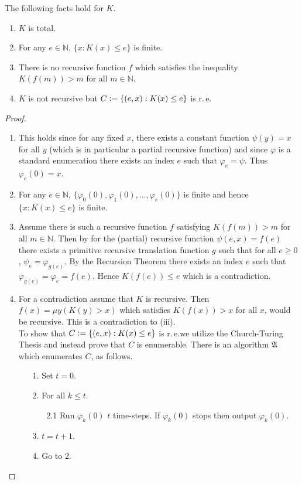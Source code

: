 \begin{prop}\label{prop:fact}
The following facts hold for $K$.
\begin{enumerate}
\item $K$ is total.
\item For any $e\in \mathbb{N}$, $\lbrace x : K(x) \le e \rbrace$ is finite.
\item There is no recursive function $f$ which satisfies the inequality $K(f(m)) > m$ for all $m \in \mathbb{N}$.
\item $K$ is not recursive but $C \vcentcolon= \lbrace (e,x): K(x) \le e \rbrace$ is r.\,e. 
\end{enumerate}
\end{prop}
\begin{proof}
\begin{enumerate}
\item  This holds since for any fixed $x$, there exists a constant function $\psi(y) = x$ for all $y$ (which is in particular a partial recursive function) and since $\varphi$ is a standard enumeration there exists an index $e$ such that $\varphi_e=\psi$. Thus $\varphi_e(0) = x$.
\item For any $e\in \mathbb{N}$, $\lbrace \varphi_0(0), \varphi_1(0), \ldots, \varphi_e(0) \rbrace$ is finite and hence $\lbrace x : K(x) \le e \rbrace$ is finite.
\item Assume there is such a recursive function $f$ satisfying $K(f(m)) > m$ for all $m \in \mathbb{N}$. Then by  for the (partial) recursive function $\psi(e,x) = f(e)$ there exists a primitive recursive translation function $g$ such that for all $e\ge 0$, $\psi_e = \varphi_{g(e)}$. By the Recursion Theorem there exists an index $e$ such that $\varphi_{g(e)} = \varphi_e=f(e)$. Hence $K(f(e)) \le e$ which is a contradiction.
\item For a contradiction assume that $K$ is recursive. Then $f(x) = \mu  y  (K(y) > x )$ which satisfies $K(f(x)) > x$ for all $x$, would be recursive.  This is a contradiction to (iii).
\\

To show that $C \vcentcolon= \lbrace (e,x): K(x) \le e \rbrace$ is r.\,e.\@ we utilize the Church-Turing Thesis and instead prove that $C$ is enumerable. There is an algorithm $\mathfrak{A}$ which enumerates $C$, as follows.
\begin{enumerate}
\item[1.] Set $t=0$.
\item[2.] For all $k \le t$.
\begin{enumerate}
\item[2.1] Run $\varphi_k(0)$ $t$ time-steps. If $\varphi_k(0)$ stops then output $\varphi_k(0)$.
\end{enumerate} 
\item[3.] $t=t+1$.
\item[4.] Go to 2.
\end{enumerate}
\end{enumerate}
\end{proof}

